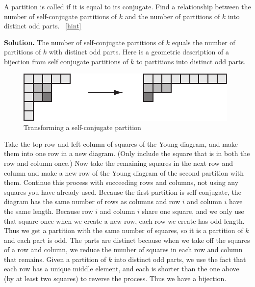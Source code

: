 \documentclass{book}
\begin{document}
\setcounter{project}{305}
\addtocounter{project}{-1}
\begin{activity}[]\label{activity-298}
\hypertarget{p-1572}{}%
A partition is called  if it is equal to its conjugate. Find a relationship between the number of self-conjugate partitions of \(k\) and the number of partitions of \(k\) into distinct odd parts.%
~\hfill{\tiny\hyperlink{a-305}{[hint]}\hypertarget{q-305}{}}\par\smallskip%
\noindent\textbf{Solution.}\hypertarget{solution-228}{}\quad%
\hypertarget{p-1574}{}%
The number of self-conjugate partitions of \(k\) equals the number of partitions of \(k\) with distinct odd parts. Here is a geometric description of a bijection from self conjugate partitions of \(k\) to partitions into distinct odd parts.%
\begin{figure}
\centering
\includegraphics[width=0.6\linewidth]{images/selfconjugate}
\caption{Transforming a self-conjugate partition\label{selfconjugate-to-distinctodd}}
\end{figure}
\hypertarget{p-1575}{}%
Take the top row and left column of squares of the Young diagram, and make them into one row in a new diagram. (Only include the square that is in both the row and column once.) Now take the remaining squares in the next row and column and make a new row of the Young diagram of the second partition with them. Continue this process with succeeding rows and columns, not using any squares you have already used. Because the first partition is self conjugate, the diagram has the same number of rows as columns and row \(i\) and column \(i\) have the same length. Because row \(i\) and column \(i\) share one square, and we only use that square once when we create a new row, each row we create has odd length. Thus we get a partition with the same number of squares, so it is a partition of \(k\) and each part is odd. The parts are distinct because when we take off the squares of a row and column, we reduce the number of squares in each row and column that remains. Given a partition of \(k\) into distinct odd parts, we use the fact that each row has a unique middle element, and each is shorter than the one above (by at least two squares) to reverse the process. Thus we have a bijection.%
\end{activity}
\end{document}
